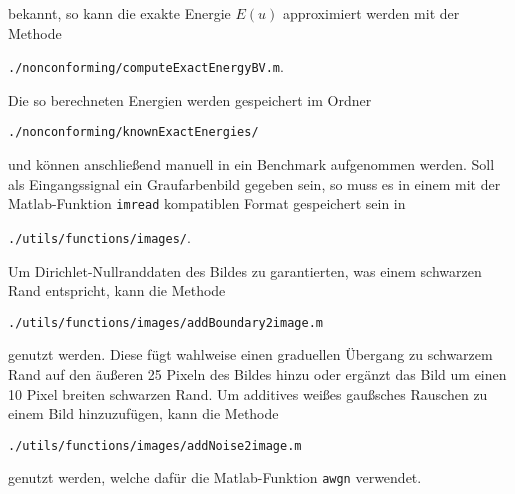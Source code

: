 bekannt, so kann die exakte Energie $E(u)$ approximiert werden mit der Methode
\begin{center}
  \texttt{./nonconforming/computeExactEnergyBV.m}.
\end{center}
Die so berechneten Energien werden gespeichert im Ordner
\begin{center}
  \texttt{./nonconforming/knownExactEnergies/}
\end{center}
und können anschließend manuell in ein Benchmark aufgenommen werden.
Soll als Eingangssignal ein Graufarbenbild gegeben sein, so muss es in einem
mit der Matlab-Funktion \texttt{imread} kompatiblen Format gespeichert sein in 
\begin{center}
  \texttt{./utils/functions/images/}.
\end{center}
Um Dirichlet-Nullranddaten des Bildes zu garantierten, was einem schwarzen Rand
entspricht, kann die Methode 
\begin{center}
  \texttt{./utils/functions/images/addBoundary2image.m}
\end{center}
genutzt werden. Diese fügt wahlweise einen graduellen Übergang zu schwarzem
Rand auf den äußeren 25 Pixeln des Bildes hinzu oder ergänzt das Bild um einen
10 Pixel breiten schwarzen Rand.
Um additives weißes gaußsches Rauschen zu einem Bild hinzuzufügen, kann die
Methode
\begin{center}
  \texttt{./utils/functions/images/addNoise2image.m}
\end{center}
genutzt werden, welche dafür die Matlab-Funktion \texttt{awgn} verwendet. 

